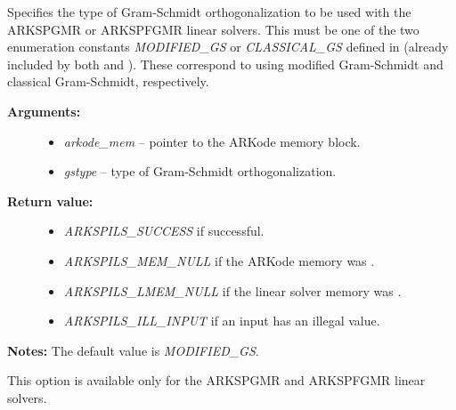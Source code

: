 \documentclass[letterpaper,10pt,english]{sphinxmanual}
\begin{document}

\begin{fulllineitems}
\label{c_interface/User_callable:c.ARKSpilsSetGSType}
Specifies the type of Gram-Schmidt orthogonalization to
be used with the ARKSPGMR or ARKSPFGMR linear solvers. This must be
one of the two enumeration constants \emph{MODIFIED\_GS} or \emph{CLASSICAL\_GS}
defined in  (already included by both
 and ). These correspond to
using modified Gram-Schmidt and classical Gram-Schmidt, respectively.
\begin{description}
\item[{\textbf{Arguments:}}] \leavevmode\begin{itemize}
\item {} 
\emph{arkode\_mem} -- pointer to the ARKode memory block.

\item {} 
\emph{gstype} -- type of Gram-Schmidt orthogonalization.

\end{itemize}

\item[{\textbf{Return value:}}] \leavevmode\begin{itemize}
\item {} 
\emph{ARKSPILS\_SUCCESS} if successful.

\item {} 
\emph{ARKSPILS\_MEM\_NULL} if the ARKode memory was .

\item {} 
\emph{ARKSPILS\_LMEM\_NULL} if the linear solver memory was .

\item {} 
\emph{ARKSPILS\_ILL\_INPUT} if an input has an illegal value.

\end{itemize}

\end{description}

\textbf{Notes:} The default value is \emph{MODIFIED\_GS}.

This option is available only for the ARKSPGMR and ARKSPFGMR linear
solvers.

\end{fulllineitems}

\end{document}
